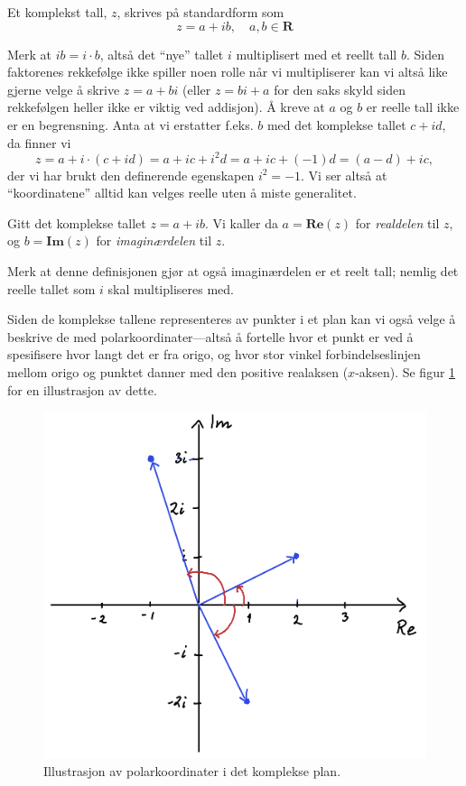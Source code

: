 \documentclass[a4paper,norsk,12pt]{article}
\begin{document}
\begin{tdef}
Et komplekst tall, $z$, skrives på standardform som
\begin{displaymath}
	z = a + ib, \quad a,b\in\mathbf{R}
\end{displaymath}
\end{tdef}
\noindent
Merk at $ib = i\cdot b$, altså det ``nye'' tallet $i$ multiplisert med et reellt tall $b$. Siden faktorenes rekkefølge ikke spiller noen rolle når vi multipliserer kan vi altså like gjerne velge å skrive $z=a+bi$ (eller $z= bi + a$ for den saks skyld siden rekkefølgen heller ikke er viktig ved addisjon). Å kreve at $a$ og $b$ er reelle tall ikke er en begrensning. Anta at vi erstatter f.eks. $b$ med det komplekse tallet $c+id$, da finner vi
\begin{displaymath}
	z = a + i\cdot(c+id) = a+ ic + i^2d = a + ic +(-1)d = (a-d)+ic,
\end{displaymath}
der vi har brukt den definerende egenskapen $i^2=-1$. Vi ser altså at ``koordinatene'' alltid kan velges reelle uten å miste generalitet. 
\begin{tdef}
	Gitt det komplekse tallet $z = a+ib$. Vi kaller da $a = \mathbf{Re}(z)$ for \emph{realdelen} til $z$, og $b=\mathbf{Im}(z)$ for \emph{imaginærdelen} til $z$.
\end{tdef}
\noindent
Merk at denne definisjonen gjør at også imaginærdelen er et reelt tall; nemlig det reelle tallet som $i$ skal multipliseres med.

Siden de komplekse tallene representeres av punkter i et plan kan vi også velge å beskrive de med polarkoordinater---altså å fortelle hvor et punkt er ved å spesifisere hvor langt det er fra origo, og hvor stor vinkel forbindelseslinjen mellom origo og punktet danner med den positive realaksen ($x$-aksen). Se figur \ref{kompleks:fig:polar} for en illustrasjon av dette. 

\begin{figure}[htp]
	\begin{center}
	\includegraphics[width=.5\textwidth]{./polarform}
	\end{center}
	\caption{Illustrasjon av polarkoordinater i det komplekse plan.}
	\label{kompleks:fig:polar}
\end{figure}
\end{document}
